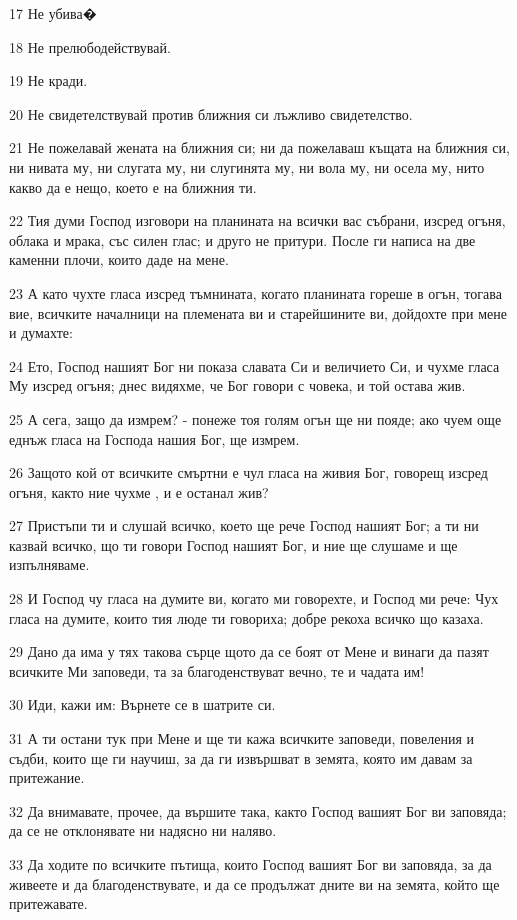 \par 17 Не убива�
\par 18 Не прелюбодействувай.
\par 19 Не кради.
\par 20 Не свидетелствувай против ближния си лъжливо свидетелство.
\par 21 Не пожелавай жената на ближния си; ни да пожелаваш къщата на ближния си, ни нивата му, ни слугата му, ни слугинята му, ни вола му, ни осела му, нито какво да е нещо, което е на ближния ти.
\par 22 Тия думи Господ изговори на планината на всички вас събрани, изсред огъня, облака и мрака, със силен глас; и друго не притури. После ги написа на две каменни плочи, които даде на мене.
\par 23 А като чухте гласа изсред тъмнината, когато планината гореше в огън, тогава вие, всичките началници на племената ви и старейшините ви, дойдохте при мене и думахте:
\par 24 Ето, Господ нашият Бог ни показа славата Си и величието Си, и чухме гласа Му изсред огъня; днес видяхме, че Бог говори с човека, и той остава жив.
\par 25 А сега, защо да измрем? - понеже тоя голям огън ще ни пояде; ако чуем още еднъж гласа на Господа нашия Бог, ще измрем.
\par 26 Защото кой от всичките смъртни е чул гласа на живия Бог, говорещ изсред огъня, както ние чухме , и е останал жив?
\par 27 Пристъпи ти и слушай всичко, което ще рече Господ нашият Бог; а ти ни казвай всичко, що ти говори Господ нашият Бог, и ние ще слушаме и ще изпълняваме.
\par 28 И Господ чу гласа на думите ви, когато ми говорехте, и Господ ми рече: Чух гласа на думите, които тия люде ти говориха; добре рекоха всичко що казаха.
\par 29 Дано да има у тях такова сърце щото да се боят от Мене и винаги да пазят всичките Ми заповеди, та за благоденствуват вечно, те и чадата им!
\par 30 Иди, кажи им: Върнете се в шатрите си.
\par 31 А ти остани тук при Мене и ще ти кажа всичките заповеди, повеления и съдби, които ще ги научиш, за да ги извършват в земята, която им давам за притежание.
\par 32 Да внимавате, прочее, да вършите така, както Господ вашият Бог ви заповяда; да се не отклонявате ни надясно ни наляво.
\par 33 Да ходите по всичките пътища, които Господ вашият Бог ви заповяда, за да живеете и да благоденствувате, и да се продължат дните ви на земята, който ще притежавате.

